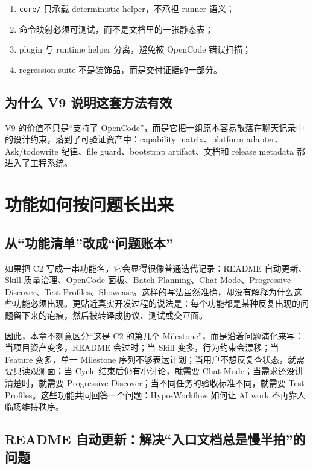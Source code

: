 \documentclass[
  outputdir=build,
  chapterstyle=cn,
  colorscheme=Simple,
  fontset=tech,
  code=false
]{Hypo-Note}
\begin{document}
\begin{enumerate}[leftmargin=2em]
  \item \texttt{core/} 只承载 deterministic helper，不承担 runner 语义；
  \item 命令映射必须可测试，而不是文档里的一张静态表；
  \item plugin 与 runtime helper 分离，避免被 OpenCode 错误扫描；
  \item regression suite 不是装饰品，而是交付证据的一部分。
\end{enumerate}

\section{为什么 V9 说明这套方法有效}

V9 的价值不只是“支持了 OpenCode”，而是它把一组原本容易散落在聊天记录中的设计约束，落到了可验证资产中：capability matrix、platform adapter、Ask/todowrite 纪律、file guard、bootstrap artifact、文档和 release metadata 都进入了工程系统。

\chapter{功能如何按问题长出来}

\section{从“功能清单”改成“问题账本”}

如果把 C2 写成一串功能名，它会显得很像普通迭代记录：README 自动更新、Skill 质量治理、OpenCode 面板、Batch Planning、Chat Mode、Progressive Discover、Test Profiles、Showcase。这样的写法虽然准确，却没有解释为什么这些功能必须出现。更贴近真实开发过程的说法是：每个功能都是某种反复出现的问题留下来的疤痕，然后被转译成协议、测试或交互面。

因此，本章不刻意区分“这是 C2 的第几个 Milestone”，而是沿着问题演化来写：当项目资产变多，README 会过时；当 Skill 变多，行为约束会漂移；当 Feature 变多，单一 Milestone 序列不够表达计划；当用户不想反复查状态，就需要只读观测面；当 Cycle 结束后仍有小讨论，就需要 Chat Mode；当需求还没讲清楚时，就需要 Progressive Discover；当不同任务的验收标准不同，就需要 Test Profiles。这些功能共同回答一个问题：Hypo-Workflow 如何让 AI work 不再靠人临场维持秩序。

\section{README 自动更新：解决“入口文档总是慢半拍”的问题}
\end{document}
